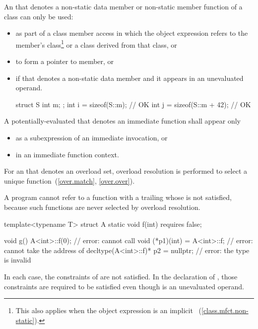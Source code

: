 \pnum
An  that denotes a non-static data member or
non-static member function of a class can only be used:
\begin{itemize}
\item as part of a class member access in which the
object expression
refers to the member's class\footnote{This also applies when the object expression
is an implicit ~(\ref{class.mfct.non-static}).} or a class derived from
that class, or

\item to form a pointer to member, or

\item if that  denotes a non-static data member
and it appears in an unevaluated operand.
\begin{example}
\begin{codeblock}
struct S {
  int m;
};
int i = sizeof(S::m);           // OK
int j = sizeof(S::m + 42);      // OK
\end{codeblock}
\end{example}
\end{itemize}

\pnum
A potentially-evaluated 
that denotes an immediate function
shall appear only
\begin{itemize}
\item as a subexpression of an immediate invocation, or
\item in an immediate function context.
\end{itemize}

\pnum
For an  that denotes an overload set,
overload resolution is performed
to select a unique function~(\ref{over.match}, \ref{over.over}).
\begin{note}
A program cannot refer to a function
with a trailing 
whose  is not satisfied,
because such functions are never selected by overload resolution.
\begin{example}
\begin{codeblock}
template<typename T> struct A {
  static void f(int) requires false;
}

void g() {
  A<int>::f(0);                         // error: cannot call 
  void (*p1)(int) = A<int>::f;          // error: cannot take the address of 
  decltype(A<int>::f)* p2 = nullptr;    // error: the type  is invalid
}
\end{codeblock}
In each case, the constraints of  are not satisfied.
In the declaration of ,
those constraints are required to be satisfied
even though
 is an unevaluated operand.
\end{example}
\end{note}

